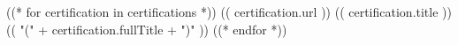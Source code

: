 
((* for certification in certifications *))
  \cvachievement
    {}
    {\itemcustomlink
      {(( certification.url ))}
      {(( certification.title )) {\footnotesize (( "(" + certification.fullTitle + ")" ))}}
    }
    {}
((* endfor *))
